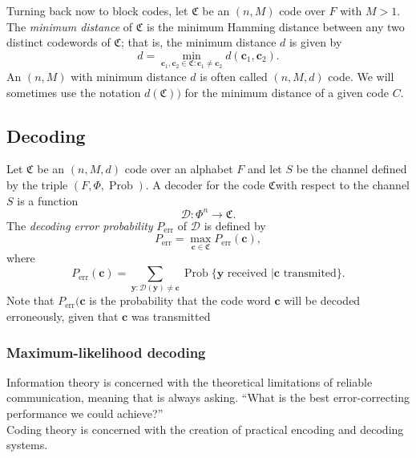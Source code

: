 Turning back now to block codes, let $\mathfrak{C}$ be an $(n,M)$ code over $F$ with $M>1$. The \textit{minimum distance} of $\mathfrak{C}$ is the minimum Hamming distance between any two distinct codewords of $\mathfrak{C}$; that is, the minimum distance $d$ is given by
\begin{equation}
d=\min_{\mathbf{c}_1,\mathbf{c}_2\in \mathfrak{C} : \mathbf{c}_1\neq \mathbf{c}_2} d(\mathbf{c}_1,\mathbf{c}_2).
\end{equation}
An $(n,M)$ with minimum distance $d$ is often called $(n,M,d)$ code. We will sometimes use the notation $d(\mathfrak{C}))$ for the minimum distance of a given code $C$.\\



\subsection{Decoding}
Let $\mathfrak{C}$ be an $(n,M,d)$ code over an alphabet $F$ and let $S$ be the channel defined by the triple $(F,\Phi,\operatorname{Prob})$. A decoder for the code $\mathfrak{C}$with respect to the channel $S$ is a function
\begin{equation}
\mathcal{D}: \Phi^n\to \mathfrak{C}.
\end{equation}
The \textit{decoding error probability} $P_{\text{err}}$ of $\mathcal{D}$ is defined by
\begin{equation}
P_{\text{err}} = \max_{\mathbf{c}\in\mathfrak{C}} P_{\text{err}}(\mathbf{c}),
\end{equation}
where 
\begin{equation}
P_{\text{err}}(\mathbf{c}) = \sum_{\mathbf{y}:\mathcal{D}(\mathbf{y})\neq \mathbf{c}} \operatorname{Prob}\{\mathbf{y}\text{ received }|\mathbf{c}\text{ transmited}\}.
\end{equation}
Note that $P_{\text{err}}(\mathbf{c}$ is the probability that the code word $\mathbf{c}$ will be decoded erroneously, given that $\mathbf{c}$ was transmitted
\subsubsection{Maximum-likelihood decoding}

\indent Information theory is concerned with the theoretical limitations of reliable communication, meaning that is always asking. ``What is the best error-correcting performance we could achieve?''\\
\indent Coding theory is concerned with the creation of practical encoding and decoding systems.




